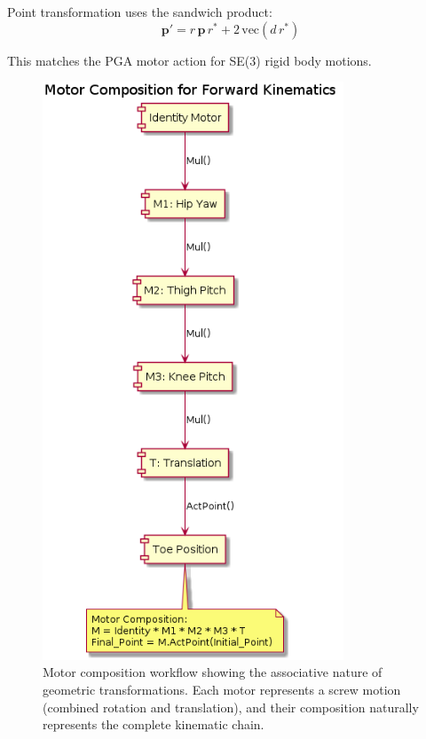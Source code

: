 \documentclass[11pt]{article}
\begin{document}
Point transformation uses the sandwich product:
\[\mathbf{p}' = r\,\mathbf{p}\,r^* + 2\,\mathrm{vec}(d\,r^*)\]

This matches the PGA motor action for SE(3) rigid body motions.

\begin{figure}[H]
    \centering
    \includegraphics[width=0.8\textwidth]{illustrations/motor_composition.png}
    \caption{Motor composition workflow showing the associative nature of geometric transformations. Each motor represents a screw motion (combined rotation and translation), and their composition naturally represents the complete kinematic chain.}
    \label{fig:motor_composition}
\end{figure}
\end{document}

